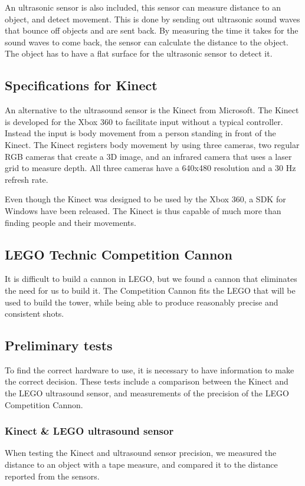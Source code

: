 An ultrasonic sensor is also included, this sensor can measure distance to an object, and detect movement. This is done by sending out ultrasonic sound waves that bounce off objects and are sent back. By measuring the time it takes for the sound waves to come back, the sensor can calculate the distance to the object. The object has to have a flat surface for the ultrasonic sensor to detect it.

\subsection{Specifications for Kinect}
An alternative to the ultrasound sensor is the Kinect from Microsoft. The Kinect is developed for the Xbox 360 to facilitate input without a typical controller. Instead the input is body movement from a person standing in front of the Kinect. The Kinect registers body movement by using three cameras, two regular RGB cameras that create a 3D image, and an infrared camera that uses a laser grid to measure depth. All three cameras have a 640x480 resolution and a 30 Hz refresh rate.

Even though the Kinect was designed to be used by the Xbox 360, a SDK for Windows have been released. The Kinect is thus capable of much more than finding people and their movements.

\subsection{LEGO Technic Competition Cannon}
It is difficult to build a cannon in LEGO, but we found a cannon that eliminates the need for us to build it. The Competition Cannon fits the LEGO that will be used to build the tower, while being able to produce reasonably precise and consistent shots.

\subsection{Preliminary tests}
To find the correct hardware to use, it is necessary to have information to make the correct decision. These tests include a comparison between the Kinect and the LEGO ultrasound sensor, and measurements of the precision of the LEGO Competition Cannon.

\subsubsection{Kinect \& LEGO ultrasound sensor}
When testing the Kinect and ultrasound sensor precision, we measured the distance to an object with a tape measure, and compared it to the distance reported from the sensors.

